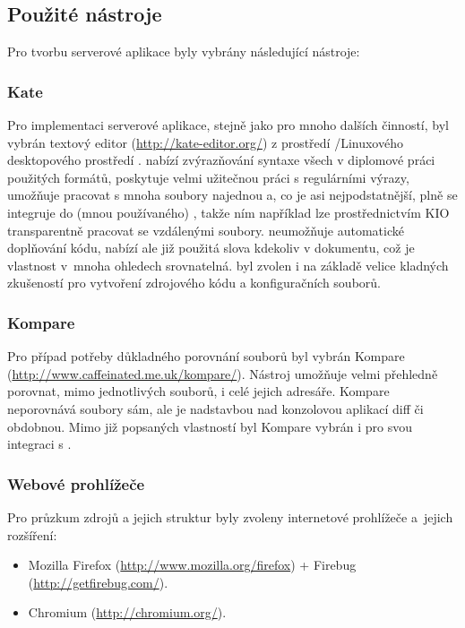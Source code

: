 \subsection{Použité nástroje}
\label{sec:server:tools}
Pro tvorbu serverové aplikace byly vybrány následující nástroje:
\subsubsection{Kate}
\label{sec:server:tools:kate}
Pro implementaci serverové aplikace, stejně jako pro mnoho dalších činností, byl vybrán textový editor  (\url{http://kate-editor.org/}) z prostředí  /Linuxového desktopového prostředí .  nabízí zvýrazňování syntaxe všech v diplomové práci použitých formátů, poskytuje velmi užitečnou práci s regulárními výrazy, umožňuje pracovat s mnoha soubory najednou a, co je asi nejpodstatnější, plně se integruje do (mnou používaného) , takže ním například lze prostřednictvím \gls{KIO} transparentně pracovat se vzdálenými soubory.  neumožňuje automatické doplňování kódu, nabízí ale již použitá slova kdekoliv v dokumentu, což je vlastnost v~mnoha ohledech srovnatelná.  byl zvolen i na základě velice kladných zkušeností pro vytvoření zdrojového kódu a konfiguračních souborů.

\subsubsection{Kompare}
\label{sec:server:tools:kompare}
Pro případ potřeby důkladného porovnání souborů byl vybrán Kompare (\url{http://www.caffeinated.me.uk/kompare/}). Nástroj umožňuje velmi přehledně porovnat, mimo jednotlivých souborů, i celé jejich adresáře. Kompare neporovnává soubory sám, ale je nadstavbou nad konzolovou aplikací diff či obdobnou. Mimo již popsaných vlastností byl Kompare vybrán i pro svou integraci s .

\subsubsection{Webové prohlížeče}
Pro průzkum zdrojů a jejich struktur byly zvoleny internetové prohlížeče a~jejich rozšíření:
\begin{itemize}
 \item Mozilla Firefox (\url{http://www.mozilla.org/firefox}) + Firebug (\url{http://getfirebug.com/}).
 \item Chromium (\url{http://chromium.org/}).
\end{itemize}

